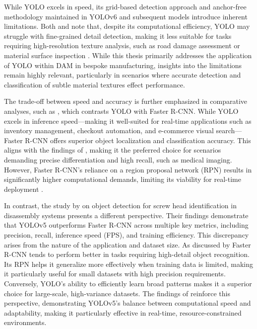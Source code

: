 \documentclass[a4paper,10pt,twocolumn]{article}
\numberwithin{figure}{section}
\numberwithin{table}{section}
\begin{document}
 While YOLO excels in speed, its grid-based detection approach and anchor-free
  methodology maintained in YOLOv6 and subsequent models introduce inherent limitations. 
  Both \cite{Sapkota2025YOLOv11}
   and \cite{he2024comprehensiveperformanceevaluationyolov11} note that, despite 
   its computational efficiency, YOLO may struggle with fine-grained detail detection, 
   making it less suitable for tasks requiring high-resolution texture analysis, 
   such as road damage assessment or material surface inspection \citep{Angulo_2019}. 
   While this thesis primarily addresses the application of YOLO within DAM in bespoke manufacturing, 
   insights into the limitations remain highly relevant, particularly in scenarios 
   where accurate detection and classification of subtle material textures effect performance.
    
   The trade-off between speed and accuracy is further emphasized in comparative 
   analyses, such as \cite{articleRANE}, which contrasts YOLO with Faster R-CNN. 
   While YOLO excels in inference speed—making it well-suited for real-time applications 
   such as inventory management, checkout automation, and e-commerce visual search—Faster 
   R-CNN offers superior object localization and classification accuracy. 
   This aligns with the findings of \cite{Sapkota2025YOLOv11}, making it the preferred choice 
   for scenarios demanding precise differentiation and high recall, such as medical imaging. 
   However, Faster R-CNN's reliance on a region proposal 
   network (RPN) results in significantly higher computational demands, limiting its 
   viability for real-time deployment \citep{articleRANE}.

   In contrast, the study by \cite{KARBOUJ2024527} on object detection for screw head identification 
   in disassembly systems presents a different perspective. Their findings demonstrate that 
   YOLOv5 outperforms Faster R-CNN across multiple key metrics, including precision, recall, 
   inference speed (FPS), and training efficiency. This discrepancy arises from the nature of
   the application and dataset size. As discussed by \cite{articleRANE} Faster R-CNN tends to perform 
   better in tasks requiring high-detail object recognition. Its RPN helps it generalize
   more effectively when training data is limited, making it 
   particularly useful for small datasets 
   with high precision requirements.
   Conversely, YOLO's ability to efficiently learn broad patterns makes it a superior choice for 
   large-scale, high-variance datasets. The findings of \cite{KARBOUJ2024527} reinforce this perspective, 
   demonstrating YOLOv5’s balance between computational speed and adaptability, making it 
   particularly effective in real-time, resource-constrained environments.
\end{document}
